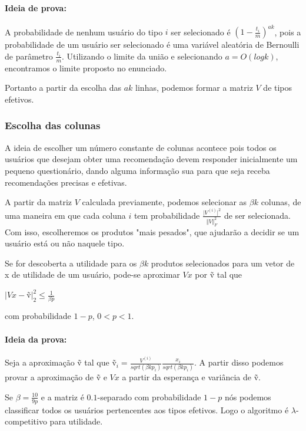 \documentclass[a4paper,10pt]{article}
\begin{document}
\paragraph{Ideia de prova:} 
A probabilidade de nenhum usuário do tipo $i$ ser selecionado é $(1 - \frac{t_i}{m})^{ak}$,
pois a probabilidade de um usuário ser selecionado é uma variável
aleatória de Bernoulli de parâmetro $\frac{t_i}{m}$. Utilizando o limite da união e selecionando $a = O(log k)$, encontramos o limite proposto no enunciado.


Portanto a partir da escolha das $ak$ linhas, podemos formar a matriz $V$ de tipos efetivos.

\subsubsection{Escolha das colunas}

A ideia de escolher um número constante de colunas acontece pois todos os usuários que desejam obter uma recomendação devem responder inicialmente um pequeno 
questionário, dando alguma informação sua para que seja receba recomendações precisas e efetivas.

A partir da matriz $V$ calculada previamente, podemos selecionar as $\beta k$ colunas, de uma maneira em que cada  
coluna $i$ tem probabilidade $\frac{\vert V^{(i)} \vert^2}{\Vert V \Vert^2_F}$ de ser selecionada. Com 
isso, escolheremos os produtos "mais pesados", que ajudarão a decidir se um usuário está ou não naquele tipo.

\begin{lema}
Se for descoberta a utilidade para os $\beta k$ produtos selecionados para um vetor
de x de utilidade de um usuário, pode-se aproximar $V x$ por \~v tal que 

$\vert V x  - $\~v$ \vert^2_2 \leq \frac{1}{\beta p}$

com probabilidade $1 - p$, $0 < p < 1$.
\end{lema}

\paragraph{Ideia da prova:}

Seja a aproximação \~v tal que \~v$_i = \frac {V^{(i)}}{sqrt(\beta k p_i)} \frac{x_i}{sqrt(\beta k p_i)}$.
 A partir disso podemos provar a aproximação de \~v e $Vx$ a partir da esperança e variância de \~v.


\begin{coro}
Se $\beta = \frac{10}{9p}$ e a matriz é $0.1$-separado com probabilidade $1 - p$
nós podemos classificar todos os usuários pertencentes aos tipos efetivos. Logo o 
algoritmo é $\lambda$-competitivo  para utilidade.
\end{coro}
\end{document}
